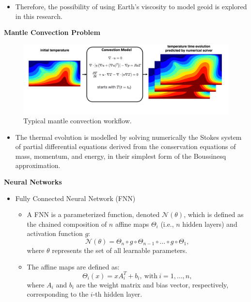 {\begin{itemize}
     \item Therefore, the possibility of using Earth's viscosity to model geoid is explored in this research.
\end{itemize}

\textbf{Mantle Convection Problem}

\begin{figure}[H]
    \includegraphics[width=\linewidth]{figures/Mantle_Convection_workflow.png}
    \caption{Typical mantle convection workflow.}
\end{figure}

\begin{itemize}
    \item The thermal evolution is modelled by solving numerically the Stokes system of partial differential equations derived from the conservation equations of mass, momentum, and energy, in their simplest form of the Boussinesq approximation. 
\end{itemize}

\textbf{Neural Networks}
\begin{itemize}
    \item Fully Connected Neural Network (FNN)
            \begin{itemize} 
                \item A FNN is a parameterized function, denoted $\mathcal{N}(\theta)$, which is defined as the chained composition of $n$ affine maps $\Theta_i$ (i.e., $n$ hidden layers) and activation function $g$:
            \begin{equation*}
            \mathcal{N}(\theta) = \Theta_n \circ g \circ \Theta_{n-1} \circ \ldots \circ g \circ \Theta_1,
            \end{equation*}
            where  $\theta$ represents the set of all learnable parameters.
               \item The affine maps are defined as:
            \begin{equation*} \Theta_i(x) = xA_i^{T} + b_i, \ \mathrm{with} \ i=1,\ldots,n, \end{equation*}
            where $A_i$ and $b_i$ are the weight matrix and bias vector, respectively, corresponding to the $i$-th hidden layer.
        \end{itemize}


\end{itemize}}
